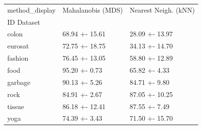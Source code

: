 \begin{tabular}{lll}
\toprule
method_display & Mahalanobis (MDS) & Nearest Neigh. (kNN) \\
ID Dataset &  &  \\
\midrule
colon & 68.94 +- 15.61 & 28.09 +- 13.97 \\
eurosat & 72.75 +- 18.75 & 34.13 +- 14.70 \\
fashion & 76.45 +- 13.05 & 58.80 +- 12.89 \\
food & 95.20 +- 0.73 & 65.82 +- 4.33 \\
garbage & 90.13 +- 5.26 & 84.71 +- 9.80 \\
rock & 84.91 +- 2.67 & 87.05 +- 10.25 \\
tissue & 86.18 +- 12.41 & 87.55 +- 7.49 \\
yoga & 74.39 +- 3.43 & 71.50 +- 15.70 \\
\bottomrule
\end{tabular}
